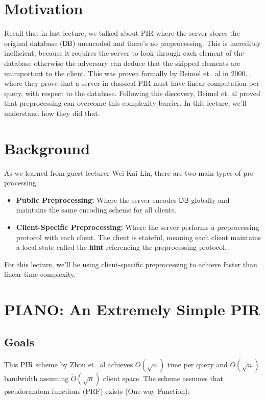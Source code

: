 \newcommand{\PRF}{\ensuremath{{\sf PRF}}}


\section{Motivation}
Recall that in last lecture, we talked about  PIR where the server stores the original database ($\mathsf{DB}$) unencoded and there's no preprocessing. This is incredibly inefficient, because it requires the server to look through each element of the database otherwise the adversary can deduce that the skipped elements are unimportant to the client. This was proven formally by Beimel et.~al in 2000. \cite{beimel2000reducing}, where they prove that a server in classical PIR must have linear computation per query, with respect to the database. Following this discovery, Beimel et. al proved that preprocessing can overcome this complexity barrier. In this lecture, we'll understand how they did that.

\section{Background}
As we learned from guest lecturer Wei-Kai Lin, there are two main types of pre-processing.\

\begin{definition}
    \hfill
    \begin{itemize}
        \item \textbf{Public Preprocessing:} Where the server encodes $\mathsf{DB}$ globally and maintains the same encoding scheme for all clients.
        \item \textbf{Client-Specific Preprocessing:} Where the server performs a preprocessing protocol with each client. The client is stateful, meaning each client maintains a local state called the \textbf{hint} referencing the preprocessing protocol.
    \end{itemize}
\end{definition}
For this lecture, we'll be using client-specific preprocessing to achieve faster than linear time complexity.

\section{PIANO: An Extremely Simple PIR}
\subsection{Goals}
This PIR scheme by Zhou et.~al achieves $O(\sqrt{n})$ time per query and $O(\sqrt{n})$ bandwidth \cite{zhou2023piano} assuming $\tilde{O}(\sqrt{n})$ client space. 
The scheme assumes that pseudorandom functions (PRF) exists (One-way Function).

